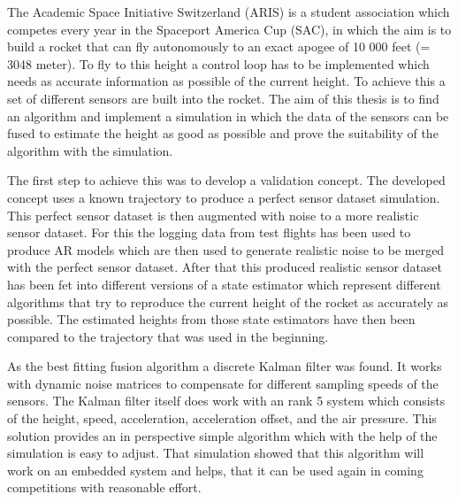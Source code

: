 The Academic Space Initiative Switzerland (ARIS) is a student association which competes every year in the Spaceport America Cup (SAC),
in which the aim is to build a rocket that can fly autonomously to an exact apogee of 10 000 feet (= 3048 meter).
To fly to this height a control loop has to be implemented which needs as accurate information as possible of the current height.
To achieve this a set of different sensors are built into the rocket.
The aim of this thesis is to find an algorithm and implement a simulation in which the data of the sensors can be fused to estimate the height as good as possible and prove the suitability of the algorithm with the simulation.


The first step to achieve this was to develop a validation concept.
The developed concept uses a known trajectory to produce a perfect sensor dataset simulation.
This perfect sensor dataset is then augmented with noise to a more realistic sensor dataset.
For this the logging data from test flights has been used to produce AR models which are then used to generate realistic noise to be merged with the perfect sensor dataset.
After that this produced realistic sensor dataset has been fet into different versions of a state estimator which represent different algorithms that try to reproduce the current height of the rocket as accurately as possible.
The estimated heights from those state estimators have then been compared to the trajectory that was used in the beginning.


As the best fitting fusion algorithm a discrete Kalman filter was found.
It works with dynamic noise matrices to compensate for different sampling speeds of the sensors.
The Kalman filter itself does work with an rank 5 system which consists of the height, speed, acceleration, acceleration offset, and the air pressure.
This solution provides an in perspective simple algorithm which with the help of the simulation is easy to adjust.
That simulation showed that this algorithm will work on an embedded system and helps, that it can be used again in coming competitions with reasonable effort.
